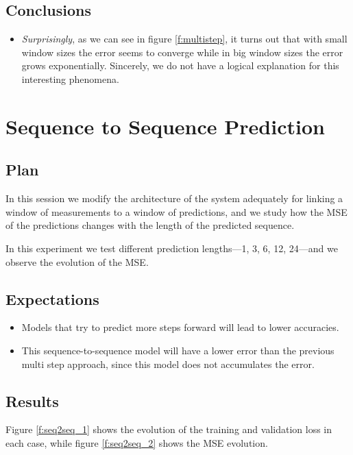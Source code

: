 \documentclass[]{article}
\begin{document}
	\subsection{Conclusions}
	
	\begin{itemize}
		\item \emph{Surprisingly}, as we can see in figure \ref{f:multistep}, it turns out that with small window sizes the error seems to converge while in big window sizes the error grows exponentially. Sincerely, we do not have a logical explanation for this interesting phenomena.
	\end{itemize}
	
	\section{Sequence to Sequence Prediction}
	
	\subsection{Plan}
	
	In this session we modify the architecture of the system adequately for linking a window of measurements to a window of predictions, and we study how the MSE of the predictions changes with the length of the predicted sequence.
	
	In this experiment we test different prediction lengths---1, 3, 6, 12, 24---and we observe the evolution of the MSE.
	
	\subsection{Expectations}
	
	\begin{itemize}
		\item Models that try to predict more steps forward will lead to lower accuracies.
		\item This sequence-to-sequence model will have a lower error than the previous multi step approach, since this model does not accumulates the error.
	\end{itemize}
	
	\subsection{Results}
	
	Figure \ref{f:seq2seq_1} shows the evolution of the training and validation loss in each case, while figure \ref{f:seq2seq_2} shows the MSE evolution.
	
\end{document}
